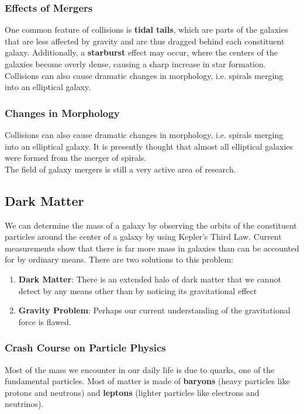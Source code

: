 \documentclass{article}
\begin{document}
	 \subsubsection{Effects of Mergers}
	  One common feature of collisions is \textbf{tidal tails}, which are parts of the galaxies that are less affected by gravity and are thus dragged behind each constituent galaxy. Additionally, a \textbf{starburst} effect may occur, where the centers of the galaxies become overly dense, causing a sharp increase in star formation. Collisions can also cause dramatic changes in morphology, i.e. spirals merging into an elliptical galaxy.\\
	  \subsubsection{Changes in Morphology} 
	  Collisions can also cause dramatic changes in morphology, i.e. spirals merging into an elliptical galaxy. It is presently thought that almost all elliptical galaxies were formed from the merger of spirals.\\
	  
	  \noindent The field of galaxy mergers is still a very active area of research.

	 \subsection{Dark Matter}
	 We can determine the mass of a galaxy by observing the orbits of the constituent particles around the center of a galaxy by using Kepler's Third Law. Current measurements show that there is far more mass in galaxies than can be accounted for by ordinary means. There are two solutions to this problem:
	 \begin{enumerate}
	 	\item\textbf{Dark Matter}: There is an extended halo of dark matter that we cannot detect by any means other than by noticing its gravitational effect
		\item\textbf{Gravity Problem}: Perhaps our current understanding of the gravitational force is flawed.
	\end{enumerate}
	\subsubsection{Crash Course on Particle Physics}
		Most of the mass we encounter in our daily life is due to quarks, one of the fundamental particles. Most of matter is made of \textbf{baryons} (heavy particles like protons and neutrons) and \textbf{leptons} (lighter particles like electrons and neutrinos).
\end{document}
